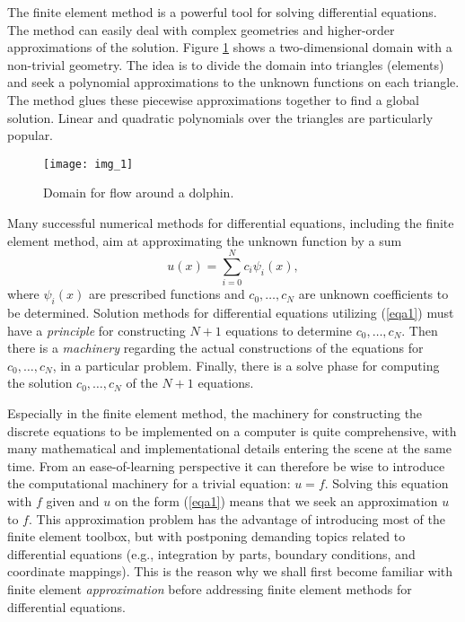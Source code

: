 \documentclass[../main.tex]{subfiles}
\begin{document}
	
	The finite element method is a powerful tool for solving differential equations.
	The method can easily deal with complex geometries and higher-order approximations of the solution. Figure \ref{fig:img_1} shows a two-dimensional domain with a non-trivial
	geometry. The idea is to divide the domain into triangles (elements) and seek
	a polynomial approximations to the unknown functions on each triangle. The
	method glues these piecewise approximations together to find a global solution.
	Linear and quadratic polynomials over the triangles are particularly popular.
	
	\begin{figure}[H]
		\centering
		\texttt{[image: img\_1]}
		\caption{Domain for flow around a dolphin.}
		\label{fig:img_1}
	\end{figure}
	
	Many successful numerical methods for differential equations, including the finite element method, aim at approximating the unknown function by a sum
	\begin{equation}\label{eqa1}
		u(x)=\sum_{i=0}^{N} c_{i} \psi_{i}(x),
	\end{equation}
	where $\psi_{i}(x)$ are prescribed functions and $c_{0}, \ldots, c_{N}$ are unknown coefficients to be determined. Solution methods for differential equations utilizing (\ref{eqa1}) must have a \textit{principle} for constructing $N+1$ equations to determine $c_{0}, \ldots, c_{N}$. Then there is a \textit{machinery} regarding the actual constructions of the equations for $c_{0}, \ldots, c_{N}$, in a particular problem. Finally, there is a solve phase for computing the solution $c_{0}, \ldots, c_{N}$ of the $N+1$ equations.
	
	Especially in the finite element method, the machinery for constructing the discrete equations to be implemented on a computer is quite comprehensive, with many mathematical and implementational details entering the scene at the same time. From an ease-of-learning perspective it can therefore be wise to introduce the computational machinery for a trivial equation: $u=f$. Solving this equation with $f$ given and $u$ on the form (\ref{eqa1}) means that we seek an approximation $u$ to $f$. This approximation problem has the advantage of introducing most of the finite element toolbox, but with postponing demanding topics related to differential equations (e.g., integration by parts, boundary conditions, and coordinate mappings). This is the reason why we shall first become familiar with finite element \textit{approximation} before addressing finite element methods for differential equations.
	
\end{document}
